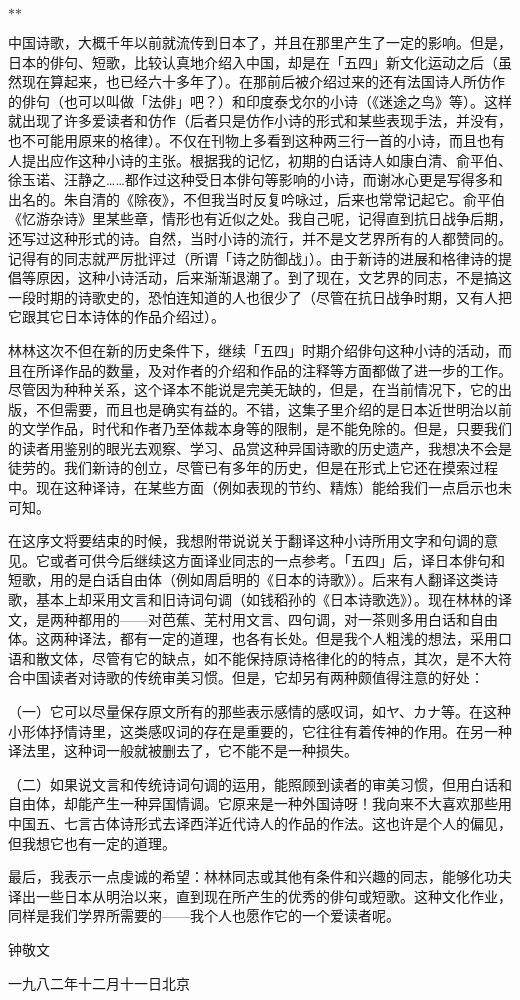 {  \centerline{\hfill$*$\hfill$*$\hfill}

  中国诗歌，大概千年以前就流传到日本了，并且在那里产生了一定的影响。但是，日本的俳句、短歌，比较认真地介绍入中国，却是在「五四」新文化运动之后（虽然现在算起来，也已经六十多年了）。在那前后被介绍过来的还有法国诗人所仿作的俳句（也可以叫做「法俳」吧？）和印度泰戈尔的小诗（《迷途之鸟》等）。这样就出现了许多爱读者和仿作（后者只是仿作小诗的形式和某些表现手法，并没有，也不可能用原来的格律）。不仅在刊物上多看到这种两三行一首的小诗，而且也有人提出应作这种小诗的主张。根据我的记忆，初期的白话诗人如康白清、俞平伯、徐玉诺、汪静之……都作过这种受日本俳句等影响的小诗，而谢冰心更是写得多和出名的。朱自清的《除夜》，不但我当时反复吟咏过，后来也常常记起它。俞平伯《忆游杂诗》里某些章，情形也有近似之处。我自己呢，记得直到抗日战争后期，还写过这种形式的诗。自然，当时小诗的流行，并不是文艺界所有的人都赞同的。记得有的同志就严厉批评过（所谓「诗之防御战」）。由于新诗的进展和格律诗的提倡等原因，这种小诗活动，后来渐渐退潮了。到了现在，文艺界的同志，不是搞这一段时期的诗歌史的，恐怕连知道的人也很少了（尽管在抗日战争时期，又有人把它跟其它日本诗体的作品介绍过）。

  林林这次不但在新的历史条件下，继续「五四」时期介绍俳句这种小诗的活动，而且在所译作品的数量，及对作者的介绍和作品的注释等方面都做了进一步的工作。尽管因为种种关系，这个译本不能说是完美无缺的，但是，在当前情况下，它的出版，不但需要，而且也是确实有益的。不错，这集子里介绍的是日本近世明治以前的文学作品，时代和作者乃至体裁本身等的限制，是不能免除的。但是，只要我们的读者用鉴别的眼光去观察、学习、品赏这种异国诗歌的历史遗产，我想决不会是徒劳的。我们新诗的创立，尽管已有多年的历史，但是在形式上它还在摸索过程中。现在这种译诗，在某些方面（例如表现的节约、精炼）能给我们一点启示也未可知。

  在这序文将要结束的时候，我想附带说说关于翻译这种小诗所用文字和句调的意见。它或者可供今后继续这方面译业同志的一点参考。「五四」后，译日本俳句和短歌，用的是白话自由体（例如周启明的《日本的诗歌》）。后来有人翻译这类诗歌，基本上却采用文言和旧诗词句调（如钱稻孙的《日本诗歌选》）。现在林林的译文，是两种都用的——对芭蕉、芜村用文言、四句调，对一茶则多用白话和自由体。这两种译法，都有一定的道理，也各有长处。但是我个人粗浅的想法，采用口语和散文体，尽管有它的缺点，如不能保持原诗格律化的的特点，其次，是不大符合中国读者对诗歌的传统审美习惯。但是，它却另有两种颇值得注意的好处：

  （一）它可以尽量保存原文所有的那些表示感情的感叹词，如ヤ、カナ等。在这种小形体抒情诗里，这类感叹词的存在是重要的，它往往有着传神的作用。在另一种译法里，这种词一般就被删去了，它不能不是一种损失。

  （二）如果说文言和传统诗词句调的运用，能照顾到读者的审美习惯，但用白话和自由体，却能产生一种异国情调。它原来是一种外国诗呀！我向来不大喜欢那些用中国五、七言古体诗形式去译西洋近代诗人的作品的作法。这也许是个人的偏见，但我想它也有一定的道理。

  最后，我表示一点虔诚的希望：林林同志或其他有条件和兴趣的同志，能够化功夫译出一些日本从明治以来，直到现在所产生的优秀的俳句或短歌。这种文化作业，同样是我们学界所需要的——我个人也愿作它的一个爱读者呢。

  \hfill 钟敬文

  \hfill 一九八二年十二月十一日北京
 }

